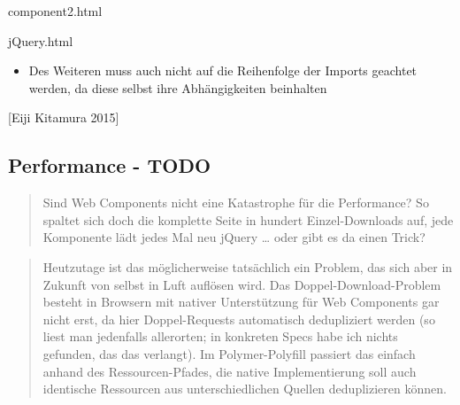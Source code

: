component2.html

\begin{Shaded}
\begin{Highlighting}[]
\end{Highlighting}
\end{Shaded}

jQuery.html

\begin{Shaded}
\begin{Highlighting}[]
\end{Highlighting}
\end{Shaded}

\begin{itemize}
\tightlist
\item
  Des Weiteren muss auch nicht auf die Reihenfolge der Imports geachtet
  werden, da diese selbst ihre Abhängigkeiten beinhalten
\end{itemize}

{[}Eiji Kitamura 2015{]}

\subsection{Performance - TODO}\label{performance---todo}

\begin{quote}
Sind Web Components nicht eine Katastrophe für die Performance? So
spaltet sich doch die komplette Seite in hundert Einzel-Downloads auf,
jede Komponente lädt jedes Mal neu jQuery \ldots{} oder gibt es da einen
Trick?
\end{quote}

\begin{quote}
Heutzutage ist das möglicherweise tatsächlich ein Problem, das sich aber
in Zukunft von selbst in Luft auflösen wird. Das Doppel-Download-Problem
besteht in Browsern mit nativer Unterstützung für Web Components gar
nicht erst, da hier Doppel-Requests automatisch dedupliziert werden (so
liest man jedenfalls allerorten; in konkreten Specs habe ich nichts
gefunden, das das verlangt). Im Polymer-Polyfill passiert das einfach
anhand des Ressourcen-Pfades, die native Implementierung soll auch
identische Ressourcen aus unterschiedlichen Quellen deduplizieren
können.
\end{quote}

